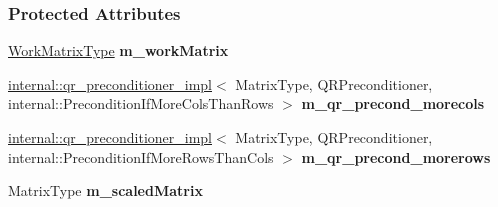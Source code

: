\subsubsection*{Protected Attributes}
\begin{DoxyCompactItemize}
\item 
\mbox{\label{group___s_v_d___module_a4d68a51c9138c05942b97482cea88a37}} 
\hyperlink{group___core___module}{Work\+Matrix\+Type} {\bfseries m\+\_\+work\+Matrix}
\item 
\mbox{\label{group___s_v_d___module_a324024bbc4fd16fb7475e6d7aaccf461}} 
\hyperlink{struct_eigen_1_1internal_1_1qr__preconditioner__impl}{internal\+::qr\+\_\+preconditioner\+\_\+impl}$<$ Matrix\+Type, Q\+R\+Preconditioner, internal\+::\+Precondition\+If\+More\+Cols\+Than\+Rows $>$ {\bfseries m\+\_\+qr\+\_\+precond\+\_\+morecols}
\item 
\mbox{\label{group___s_v_d___module_ab0e2c0526b83dbd4c47ce686fe867f68}} 
\hyperlink{struct_eigen_1_1internal_1_1qr__preconditioner__impl}{internal\+::qr\+\_\+preconditioner\+\_\+impl}$<$ Matrix\+Type, Q\+R\+Preconditioner, internal\+::\+Precondition\+If\+More\+Rows\+Than\+Cols $>$ {\bfseries m\+\_\+qr\+\_\+precond\+\_\+morerows}
\item 
\mbox{\label{group___s_v_d___module_a0b861908151379c8f9002f6d56e69107}} 
Matrix\+Type {\bfseries m\+\_\+scaled\+Matrix}
\end{DoxyCompactItemize}

